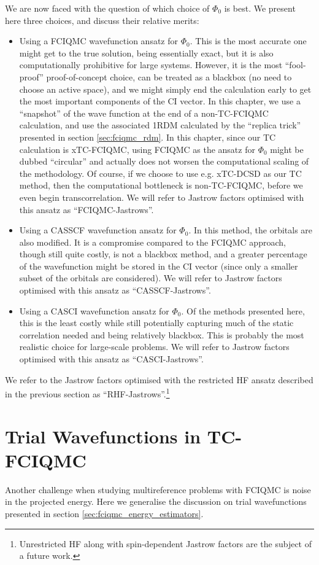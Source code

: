 We are now faced with the question of which choice of $\Phi_0$ is best. We present here three choices, and discuss their relative merits:
\begin{itemize}
    \item Using a FCIQMC wavefunction ansatz for $\Phi_0$. This is the most accurate one might get to the true solution, being essentially exact, but it is also computationally prohibitive for large systems. However, it is the most ``fool-proof'' proof-of-concept choice, can be treated as a blackbox (no need to choose an active space), and we might simply end the calculation early to get the most important components of the CI vector. In this chapter, we use a ``snapshot'' of the wave function at the end of a non-TC-FCIQMC calculation, and use the associated 1RDM calculated by the ``replica trick'' presented in section \ref{sec:fciqmc_rdm}. In this chapter, since our TC calculation is xTC-FCIQMC, using FCIQMC as the ansatz for $\Phi_0$ might be dubbed ``circular'' and actually does not worsen the computational scaling of the methodology. Of course, if we choose to use e.g. xTC-DCSD as our TC method, then the computational bottleneck is non-TC-FCIQMC, before we even begin transcorrelation. We will refer to Jastrow factors optimised with this ansatz as ``FCIQMC-Jastrows''.
    \item Using a CASSCF wavefunction ansatz for $\Phi_0$. In this method, the orbitals are also modified. It is a compromise compared to the FCIQMC approach, though still quite costly, is not a blackbox method, and a greater percentage of the wavefunction might be stored in the CI vector (since only a smaller subset of the orbitals are considered). We will refer to Jastrow factors optimised with this ansatz as ``CASSCF-Jastrows''.
    \item Using a CASCI wavefunction ansatz for $\Phi_0$. Of the methods presented here, this is the least costly while still potentially capturing much of the static correlation needed and being relatively blackbox.\supercite{levineCAS2021} This is probably the most realistic choice for large-scale problems. We will refer to Jastrow factors optimised with this ansatz as ``CASCI-Jastrows''.
\end{itemize}
We refer to the Jastrow factors optimised with the restricted HF ansatz described in the previous section as ``RHF-Jastrows''.\footnote{Unrestricted HF along with spin-dependent Jastrow factors are the subject of a future work.}

\section{Trial Wavefunctions in TC-FCIQMC}
\begingroup
\def\trial {\Phi_\mathrm{trial}}
\def\evec {\Phi_\mathrm{FCIQMC}}
Another challenge when studying multireference problems with FCIQMC is noise in the projected energy. Here we generalise the discussion on trial wavefunctions presented in section \ref{sec:fciqmc_energy_estimators}.

